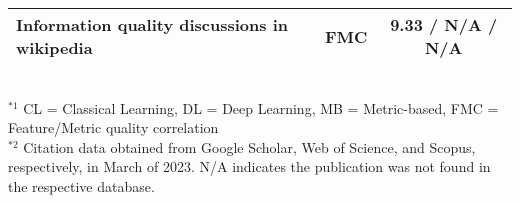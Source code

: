 \begin{table}[htbp]
\begin{tabular}{m{} c c}
        Information quality discussions in wikipedia~\cite{Stvilia2005_lr12} & FMC & 9.33 / N/A / N/A \\
        \bottomrule
    \end{tabular}
    \vspace{0.1cm}
    \footnotesize
    \RaggedRight
    \\$^{*1}$ CL = Classical Learning, DL = Deep Learning, MB = Metric-based, FMC = Feature/Metric quality correlation
    \\ $^{*2}$ Citation data obtained from Google Scholar, Web of Science, and Scopus, respectively, in March of 2023. N/A indicates the publication was not found in the respective database.
\end{table}